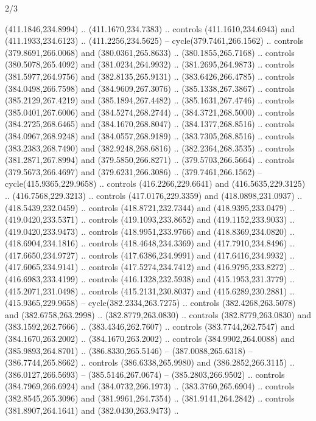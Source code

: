 \begin{flagdescription}{2/3}
\begin{scope}[xshift=0.5\flaglength,yshift=0.5\flagwidth,scale=\flagwidth/495.65]
\begin{scope}[y=0.8pt, x=0.8pt, yscale=-1,shift={(-463.76,-309.78)}]
  (411.1846,234.8994) .. (411.1670,234.7383) .. controls (411.1610,234.6943) and
  (411.1933,234.6123) .. (411.2256,234.5625) -- cycle(379.7461,266.1562) ..
  controls (379.8691,266.0068) and (380.0361,265.8633) .. (380.1855,265.7168) ..
  controls (380.5078,265.4092) and (381.0234,264.9932) .. (381.2695,264.9873) ..
  controls (381.5977,264.9756) and (382.8135,265.9131) .. (383.6426,266.4785) ..
  controls (384.0498,266.7598) and (384.9609,267.3076) .. (385.1338,267.3867) ..
  controls (385.2129,267.4219) and (385.1894,267.4482) .. (385.1631,267.4746) ..
  controls (385.0401,267.6006) and (384.5274,268.2744) .. (384.3721,268.5000) ..
  controls (384.2725,268.6465) and (384.1670,268.8047) .. (384.1377,268.8516) ..
  controls (384.0967,268.9248) and (384.0557,268.9189) .. (383.7305,268.8516) ..
  controls (383.2383,268.7490) and (382.9248,268.6816) .. (382.2364,268.3535) ..
  controls (381.2871,267.8994) and (379.5850,266.8271) .. (379.5703,266.5664) ..
  controls (379.5673,266.4697) and (379.6231,266.3086) .. (379.7461,266.1562) --
  cycle(415.9365,229.9658) .. controls (416.2266,229.6641) and
  (416.5635,229.3125) .. (416.7568,229.3213) .. controls (417.0176,229.3359) and
  (418.0898,231.0937) .. (418.5439,232.0459) .. controls (418.8721,232.7344) and
  (418.9395,233.0479) .. (419.0420,233.5371) .. controls (419.1093,233.8652) and
  (419.1152,233.9033) .. (419.0420,233.9473) .. controls (418.9951,233.9766) and
  (418.8369,234.0820) .. (418.6904,234.1816) .. controls (418.4648,234.3369) and
  (417.7910,234.8496) .. (417.6650,234.9727) .. controls (417.6386,234.9991) and
  (417.6416,234.9932) .. (417.6065,234.9141) .. controls (417.5274,234.7412) and
  (416.9795,233.8272) .. (416.6983,233.4199) .. controls (416.1328,232.5938) and
  (415.1953,231.3779) .. (415.2071,231.0498) .. controls (415.2131,230.8037) and
  (415.6289,230.2881) .. (415.9365,229.9658) -- cycle(382.2334,263.7275) ..
  controls (382.4268,263.5078) and (382.6758,263.2998) .. (382.8779,263.0830) ..
  controls (382.8779,263.0830) and (383.1592,262.7666) .. (383.4346,262.7607) ..
  controls (383.7744,262.7547) and (384.1670,263.2002) .. (384.1670,263.2002) ..
  controls (384.9902,264.0088) and (385.9893,264.8701) .. (386.8330,265.5146) --
  (387.0088,265.6318) -- (386.7744,265.8662) .. controls (386.6338,265.9980) and
  (386.2852,266.3115) .. (386.0127,266.5693) -- (385.5146,267.0674) --
  (385.2803,266.9502) .. controls (384.7969,266.6924) and (384.0732,266.1973) ..
  (383.3760,265.6904) .. controls (382.8545,265.3096) and (381.9961,264.7354) ..
  (381.9141,264.2842) .. controls (381.8907,264.1641) and (382.0430,263.9473) ..

\end{scope}
\end{scope}
\end{flagdescription}
